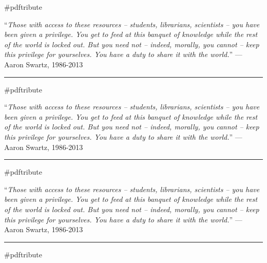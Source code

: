 \documentclass{article}
\begin{document}
\begin{center}
    {\Huge\#pdftribute}
\end{center}

``\textit{Those with access to these resources -- students, librarians,
scientists -- you have been given a privilege. You get to feed at this
banquet of knowledge while the rest of the world is locked out. But you need
not -- indeed, morally, you cannot -- keep this privilege for yourselves. You
have a duty to share it with the world.}'' --- Aaron Swartz, 1986-2013

\vspace{0.25in}
\rule{6in}{1px}
\vspace{0.1in}

\begin{center}
    {\Huge\#pdftribute}
\end{center}

``\textit{Those with access to these resources -- students, librarians,
scientists -- you have been given a privilege. You get to feed at this
banquet of knowledge while the rest of the world is locked out. But you need
not -- indeed, morally, you cannot -- keep this privilege for yourselves. You
have a duty to share it with the world.}'' --- Aaron Swartz, 1986-2013

\vspace{0.25in}
\rule{6in}{1px}
\vspace{0.1in}

\begin{center}
    {\Huge\#pdftribute}
\end{center}

``\textit{Those with access to these resources -- students, librarians,
scientists -- you have been given a privilege. You get to feed at this
banquet of knowledge while the rest of the world is locked out. But you need
not -- indeed, morally, you cannot -- keep this privilege for yourselves. You
have a duty to share it with the world.}'' --- Aaron Swartz, 1986-2013

\vspace{0.25in}
\rule{6in}{1px}
\vspace{0.1in}

\begin{center}
    {\Huge\#pdftribute}
\end{center}
\end{document}
